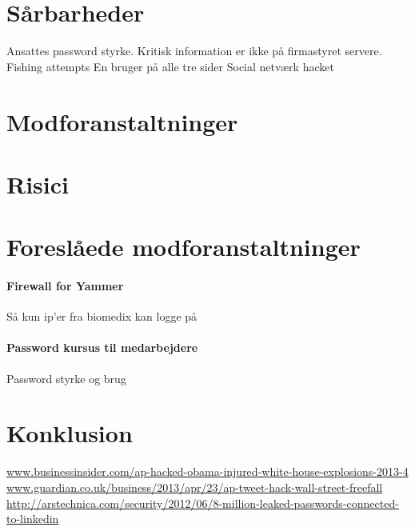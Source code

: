\documentclass{article}
\begin{document}
\section{Sårbarheder}

Ansattes password styrke.
Kritisk information er ikke på firmastyret servere.
Fishing attempts
En bruger på alle tre sider
Social netværk hacket

\section{Modforanstaltninger}

\section{Risici}

\section{Foreslåede modforanstaltninger}

\paragraph{Firewall for Yammer}
Så kun ip'er fra biomedix kan logge på

\paragraph{Password kursus til medarbejdere}

Password styrke og brug

\section{Konklusion}


\newpage
\begin{thebibliography}{100}


\url{www.businessinsider.com/ap-hacked-obama-injured-white-house-explosions-2013-4}
\url{www.guardian.co.uk/business/2013/apr/23/ap-tweet-hack-wall-street-freefall}
\url{http://arstechnica.com/security/2012/06/8-million-leaked-passwords-connected-to-linkedin}
\end{thebibliography}
\end{document}
